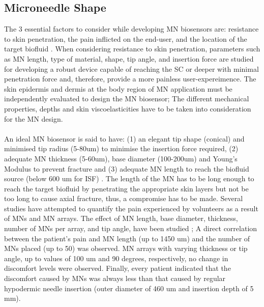 \begin{appendices}
\subsection{Microneedle Shape}
The 3 essential factors to consider while developing MN biosensors are: resistance
to skin penetration, the pain inflicted on the end-user, and the location of the target biofluid \cite{GARCIAGUZMAN2021116148}. When considering resistance to skin penetration, parameters such as MN length, type of material, shape, tip angle, and insertion force are studied for developing a robust device capable of reaching the SC or deeper with minimal penetration force and, therefore, provide a more painless user-expereimence. The skin epidermis and dermis at the body region of MN application must be independently evaluated to design the MN biosensor; The different mechanical properties, depths and skin viscoelasticities have to be taken into consideration for the MN design. \\\\
An ideal MN biosensor is said to have: (1) an elegant tip shape (conical) \cite{chang2020optimal} and minimised tip radius (5-80um) to minimise the insertion force required, (2) adequate MN thickness (5-60um), base diameter (100-200um) and Young's Modulus to prevent fracture and (3) adequate MN length to reach the biofluid source (below 600 um for ISF) \cite{GARCIAGUZMAN2021116148}. The length of the MN has to be long enough to reach the target biofluid by penetrating the appropriate skin layers but not be too long to cause axial fracture, thus, a compromise has to be made. Several studies have attempted to quantify the pain experienced by volunteers as a result of MNs and MN arrays. The effect of MN length, base diameter, thickness, number of MNs per array, and tip angle, have been studied \cite{li2013optimized, gill2008effect, lee2018three}; A direct correlation between the patient's pain and MN length (up to 1450 um) and the number of MNs placed (up to 50) was observed. MN arrays with varying thickness or tip angle, up to values of 100 um and 90 degrees, respectively, no change in discomfort levels were observed. Finally, every patient indicated that the discomfort caused by MNs was always less than that caused by regular hypodermic needle insertion (outer diameter of 460 um and insertion depth of 5 mm). 

\end{appendices}

